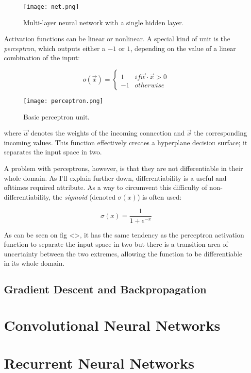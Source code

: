 \begin{figure}
\label{fig.neuralnet}
\center
\texttt{[image: net.png]}
\caption{Multi-layer neural network with a single hidden layer.}
\end{figure}

Activation functions can be linear or nonlinear.
A special kind of unit is the \textit{perceptron},
which outputs either a $-1$ or $1$,
depending on the value of a linear combination of the input:

\begin{equation}
\label{eq.perceptron}
o(\overrightarrow{x}) = \begin{cases}
1 & if \overrightarrow{w}\cdot\overrightarrow{x} > 0 \\
-1 & otherwise
\end{cases}
\end{equation}

\begin{figure}
\label{fig.perceptron}
\center
\texttt{[image: perceptron.png]}
\caption{Basic perceptron unit.}
\end{figure}

where $\overrightarrow{w}$ denotes the weights of the incoming connection
and $\overrightarrow{x}$ the corresponding incoming values.
This function effectively creates a hyperplane decision surface;
it separates the input space in two.

A problem with perceptrons, however,
is that they are not differentiable
in their whole domain.
As I'll explain further down, %
differentiability is a useful and ofttimes required attribute.
As a way to circumvent this difficulty of non-differentiability,
the \textit{sigmoid} (denoted $\sigma(x)$) is often used:

\begin{equation}
\label{eq.sigmoid}
\sigma(x) = \frac{1}{1 + e^{-x}}
\end{equation}

As can be seen on fig <>,
it has the same tendency as the perceptron activation function
to separate the input space in two
but there is a transition area of uncertainty between the two extremes,
allowing the function to be differentiable in its whole domain.

\subsection{Gradient Descent and Backpropagation}

\section{Convolutional Neural Networks}

\section{Recurrent Neural Networks}